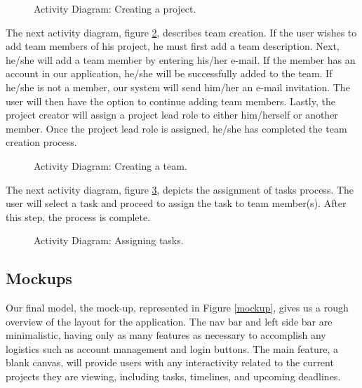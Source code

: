 \begin{figure}[ht]
\centering
{}
\caption{Activity Diagram: Creating a project.}
\label{activityOne}
\end{figure}
\FloatBarrier
\par The next activity diagram, figure \ref{activityTwo}, describes team creation. If the user wishes to add team members of his project, he must first add a team description. Next, he/she will add a team member by entering his/her e-mail. If the member has an account in our application, he/she will be successfully added to the team. If he/she is not a member, our system will send him/her an e-mail invitation. The user will then have the option to continue adding team members. Lastly, the project creator will assign a project lead role to either him/herself or another member. Once the project lead role is assigned, he/she has completed the team creation process. 


\begin{figure}[ht]
\centering
{}
\caption{Activity Diagram: Creating a team.}
\label{activityTwo}
\end{figure}
\FloatBarrier

\par The next activity diagram, figure \ref{activityFour}, depicts the assignment of  tasks process. The user will select a task and proceed to assign the task to team member(s). After this step, the process is complete. 

\begin{figure}[ht]
\centering
{}
\caption{Activity Diagram: Assigning tasks.}
\label{activityFour}
\end{figure}
\FloatBarrier


\subsection{Mockups}

Our final model, the mock-up, represented in Figure \ref{mockup}, gives us a rough overview of the layout for the application. The nav bar and left side bar are minimalistic, having only as many features as necessary to accomplish any logistics such as account management and login buttons. The main feature, a blank canvas, will provide users with any interactivity related to the current projects they are viewing, including tasks, timelines, and upcoming deadlines. 

